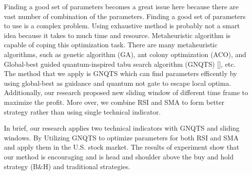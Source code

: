 \documentclass[../main.tex]{subfiles}
\begin{document}
\bigbreak

Finding a good set of parameters becomes a great issue here because there are vast number of combination of the parameters. Finding a good set of parameters to use is a complex problem. Using exhaustive method is probably not a smart idea because it takes to much time and resource. Metaheuristic algorithm is capable of coping this optimization task. There are many metaheuristic algorithms, such as genetic algorithm (GA), ant colony optimization (ACO), and Global-best guided quantum-inspired tabu search algorithm (GNQTS) [], etc. The method that we apply is GNQTS which can find parameters efficently by using global-best as guidance and quantum not gate to escape local optima. Additionally, our research proposed new sliding window of different time frame to maximize the profit. More over, we combine RSI and SMA to form better strategy rather than using single technical indicator.

\bigbreak

In brief, our research applies two technical indicators with GNQTS and sliding windows. By Utilizing GNQTS to optimize parameters for both RSI and SMA and apply them in the U.S. stock market. The results of experiment show that our method is encouraging and is head and shoulder above the buy and hold strategy (B\&H) and traditional strategies.
\end{document}
